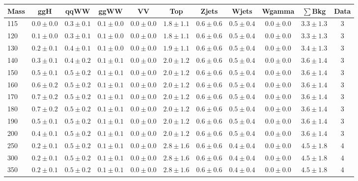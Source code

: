 \begin{table}
{\scriptsize
 \begin{center}
 \begin{tabular}{l c c c c c c c c c c }
 \hline
 Mass & ggH & qqWW & ggWW & VV & Top & Zjets & Wjets & Wgamma & $\sum$Bkg & Data \\
 \hline
115 & $0.0\pm0.0$ & $0.3\pm0.1$ & $0.1\pm0.0$ & $0.0\pm0.0$ & $1.8\pm1.1$ & $0.6\pm0.6$ & $0.5\pm0.4$ & $0.0\pm0.0$ & $3.3\pm1.3$ & 3 \\
120 & $0.1\pm0.0$ & $0.3\pm0.1$ & $0.1\pm0.0$ & $0.0\pm0.0$ & $1.8\pm1.1$ & $0.6\pm0.6$ & $0.5\pm0.4$ & $0.0\pm0.0$ & $3.3\pm1.3$ & 3 \\
130 & $0.2\pm0.1$ & $0.4\pm0.1$ & $0.1\pm0.0$ & $0.0\pm0.0$ & $1.9\pm1.1$ & $0.6\pm0.6$ & $0.5\pm0.4$ & $0.0\pm0.0$ & $3.4\pm1.3$ & 3 \\
140 & $0.3\pm0.1$ & $0.4\pm0.2$ & $0.1\pm0.1$ & $0.0\pm0.0$ & $2.0\pm1.2$ & $0.6\pm0.6$ & $0.5\pm0.4$ & $0.0\pm0.0$ & $3.6\pm1.4$ & 3 \\
150 & $0.5\pm0.1$ & $0.5\pm0.2$ & $0.1\pm0.1$ & $0.0\pm0.0$ & $2.0\pm1.2$ & $0.6\pm0.6$ & $0.5\pm0.4$ & $0.0\pm0.0$ & $3.6\pm1.4$ & 3 \\
160 & $0.6\pm0.2$ & $0.5\pm0.2$ & $0.1\pm0.1$ & $0.0\pm0.0$ & $2.0\pm1.2$ & $0.6\pm0.6$ & $0.5\pm0.4$ & $0.0\pm0.0$ & $3.6\pm1.4$ & 3 \\
170 & $0.7\pm0.2$ & $0.5\pm0.2$ & $0.1\pm0.1$ & $0.0\pm0.0$ & $2.0\pm1.2$ & $0.6\pm0.6$ & $0.5\pm0.4$ & $0.0\pm0.0$ & $3.6\pm1.4$ & 3 \\
180 & $0.7\pm0.2$ & $0.5\pm0.2$ & $0.1\pm0.1$ & $0.0\pm0.0$ & $2.0\pm1.2$ & $0.6\pm0.6$ & $0.5\pm0.4$ & $0.0\pm0.0$ & $3.6\pm1.4$ & 3 \\
190 & $0.5\pm0.1$ & $0.5\pm0.2$ & $0.1\pm0.1$ & $0.0\pm0.0$ & $2.0\pm1.2$ & $0.6\pm0.6$ & $0.5\pm0.4$ & $0.0\pm0.0$ & $3.6\pm1.4$ & 3 \\
200 & $0.4\pm0.1$ & $0.5\pm0.2$ & $0.1\pm0.1$ & $0.0\pm0.0$ & $2.0\pm1.2$ & $0.6\pm0.6$ & $0.5\pm0.4$ & $0.0\pm0.0$ & $3.6\pm1.4$ & 3 \\
250 & $0.2\pm0.1$ & $0.5\pm0.2$ & $0.1\pm0.1$ & $0.0\pm0.0$ & $2.8\pm1.6$ & $0.6\pm0.6$ & $0.4\pm0.4$ & $0.0\pm0.0$ & $4.5\pm1.8$ & 4 \\
300 & $0.2\pm0.1$ & $0.5\pm0.2$ & $0.1\pm0.1$ & $0.0\pm0.0$ & $2.8\pm1.6$ & $0.6\pm0.6$ & $0.4\pm0.4$ & $0.0\pm0.0$ & $4.5\pm1.8$ & 4 \\
350 & $0.2\pm0.1$ & $0.5\pm0.2$ & $0.1\pm0.1$ & $0.0\pm0.0$ & $2.8\pm1.6$ & $0.6\pm0.6$ & $0.4\pm0.4$ & $0.0\pm0.0$ & $4.5\pm1.8$ & 4 \\

\end{tabular}
\end{center}}
\end{table}
